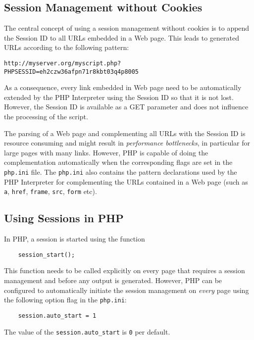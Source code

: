 \documentclass[a4paper, justified, notoc]{tufte-handout} %
\begin{document}
\subsection{Session Management without Cookies} %
\label{sub:session_without_cookies}
The central concept of using a session management without cookies is to append the Session ID to all URLs embedded in a Web page. This leads to generated URLs according to the following pattern:
\begin{Verbatim}
http://myserver.org/myscript.php?PHPSESSID=eh2czw36afpn71r8kbt03q4p8005
\end{Verbatim}  
As a consequence, every link embedded in Web page need to be automatically extended by the PHP Interpreter using the Session ID so that it is not lost. %
However, the Session ID is available as a GET parameter and does not influence the processing of the script.

The parsing of a Web page and complementing all URLs with the Session ID is resource consuming and might result in \emph{performance bottlenecks}, in particular for large pages with many links.
However, PHP is capable of doing the complementation automatically when the corresponding flags are set in the \texttt{php.ini} file. The \texttt{php.ini} also contains the pattern declarations used by the PHP Interpreter for complementing the URLs contained in a Web page (such as \texttt{a}, \texttt{href}, \texttt{frame}, \texttt{src}, \texttt{form} etc).


\subsection{Using Sessions in PHP} %
\label{sub:using_sessions_in_php}
In PHP, a session is started using the function
\begin{Verbatim}
  	session_start();
\end{Verbatim}  
This function needs to be called explicitly on every page that requires a session management and before any output is generated.
However, PHP can be configured to automatically initiate the session management on \emph{every} page using the following option flag in the \texttt{php.ini}:
\begin{Verbatim}
	session.auto_start = 1
\end{Verbatim} 
The value of the \texttt{session.auto\_start} is \texttt{0} per default. 
\end{document}
